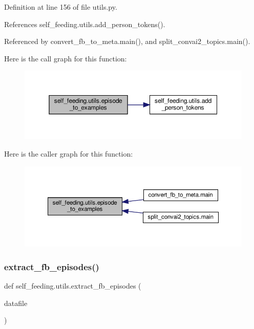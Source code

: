 Definition at line 156 of file utils.\+py.



References self\+\_\+feeding.\+utils.\+add\+\_\+person\+\_\+tokens().



Referenced by convert\+\_\+fb\+\_\+to\+\_\+meta.\+main(), and split\+\_\+convai2\+\_\+topics.\+main().

Here is the call graph for this function\+:
\nopagebreak
\begin{figure}[H]
\begin{center}
\leavevmode
\includegraphics[width=350pt]{namespaceself__feeding_1_1utils_a40d25d283be41f59e7167424691b4ba8_cgraph}
\end{center}
\end{figure}
Here is the caller graph for this function\+:
\nopagebreak
\begin{figure}[H]
\begin{center}
\leavevmode
\includegraphics[width=350pt]{namespaceself__feeding_1_1utils_a40d25d283be41f59e7167424691b4ba8_icgraph}
\end{center}
\end{figure}
\mbox{\label{namespaceself__feeding_1_1utils_a578aab95575fe72eee6768341a257a05}} 
\subsubsection{\texorpdfstring{extract\+\_\+fb\+\_\+episodes()}{extract\_fb\_episodes()}}
{\footnotesize\ttfamily def self\+\_\+feeding.\+utils.\+extract\+\_\+fb\+\_\+episodes (\begin{DoxyParamCaption}\item[{}]{datafile }\end{DoxyParamCaption})}



